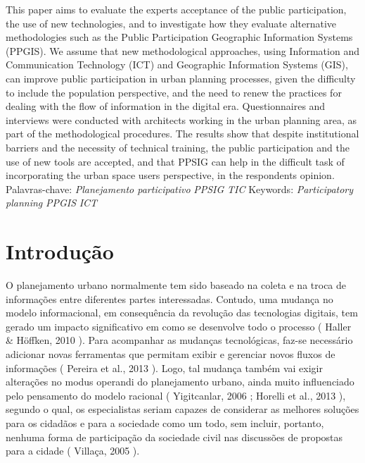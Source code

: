 \documentclass{article}
\begin{document}
This paper aims to evaluate the experts acceptance of the public participation,
					the use of new technologies, and to investigate how they evaluate alternative
					methodologies such as the Public Participation Geographic Information Systems
					(PPGIS). We assume that new methodological approaches, using Information and
					Communication Technology (ICT) and Geographic Information Systems (GIS), can
					improve public participation in urban planning processes, given the difficulty
					to include the population perspective, and the need to renew the practices for
					dealing with the flow of information in the digital era. Questionnaires and
					interviews were conducted with architects working in the urban planning area, as
					part of the methodological procedures. The results show that despite
					institutional barriers and the necessity of technical training, the public
					participation and the use of new tools are accepted, and that PPSIG can help in
					the difficult task of incorporating the urban space users perspective, in the
					respondents opinion.
Palavras-chave: %
\textit{Planejamento participativo}
\textit{PPSIG}
\textit{TIC}
Keywords: %
\textit{Participatory planning}
\textit{PPGIS}
\textit{ICT}
\section{%
Introdução}

O planejamento urbano normalmente tem sido baseado na coleta e na troca de
				informações entre diferentes partes interessadas. Contudo, uma mudança no modelo
				informacional, em consequência da revolução das tecnologias digitais, tem gerado um
				impacto significativo em como se desenvolve todo o processo (%
Haller \& Höffken, 2010%
). Para acompanhar as mudanças
				tecnológicas, faz-se necessário adicionar novas ferramentas que permitam exibir e
				gerenciar novos fluxos de informações (%
Pereira et
					al., 2013%
). Logo, tal mudança também vai exigir alterações no
modus operandi%
 do planejamento urbano, ainda muito influenciado
				pelo pensamento do modelo racional (%
Yigitcanlar,
					2006%
; %
Horelli et al., 2013%
),
				segundo o qual, os especialistas seriam capazes de considerar as melhores soluções
				para os cidadãos e para a sociedade como um todo, sem incluir, portanto, nenhuma
				forma de participação da sociedade civil nas discussões de propostas para a cidade
					(%
Villaça, 2005%
).
\end{document}
